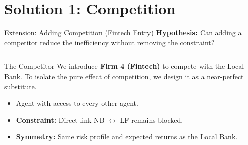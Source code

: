 \documentclass[aspectratio=169]{beamer}
\begin{document}


\section{Solution 1: Competition}

\begin{frame}{Extension: Adding Competition (Fintech Entry)}
    \textbf{Hypothesis:} Can adding a competitor reduce the inefficiency without removing the constraint?
    
    \begin{columns}[T]
            \begin{block}{The Competitor}
                We introduce \textbf{Firm 4 (Fintech)} to compete with the Local Bank. To isolate the pure effect of competition, we design it as a near-perfect substitute.
                
                \begin{itemize}
                    \item Agent with access to every other agent.
                    \item \textbf{Constraint:} Direct link NB $\leftrightarrow$ LF remains \textcolor{AlertRed}{blocked}.
                    \item \textbf{Symmetry:} Same risk profile and expected returns as the Local Bank.
                \end{itemize}
            \end{block}
            
            \centering
            
\end{columns}
\end{frame}
\end{document}
